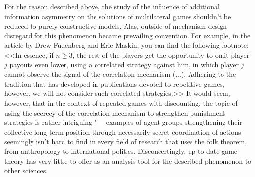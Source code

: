 For the reason described above, the study of the influence of additional information asymmetry on the solutions of multilateral games shouldn't be reduced to purely constructive models. Alas, outside of mechanism design disregard for this phenomenon became prevailing convention. For example, in the article \cite{Fudenberg} by Drew Fudenberg and Eric Maskin, you can find the following footnote: <<In essence, if $n \ge 3$, the rest of the players get the opportunity to omit player $j$ payouts even lower, using a correlated strategy against him, in which player $j$ cannot observe the signal of the correlation mechanism (...). Adhering to the tradition that has developed in publications devoted to repetitive games, however, we will not consider such correlated strategies.>> It would seem, however, that in the context of repeated games with discounting, the topic of using the secrecy of the correlation mechanism to strengthen punishment strategies is rather intriguing "--- examples of agent groups strengthening their collective long-term position through necessarily secret coordination of actions seemingly isn't hard to find in every field of research that uses the folk theorem, from anthropology to international politics. Disconcertingly, up to date game theory has very little to offer as an analysis tool for the described phenomenon to other sciences. %

